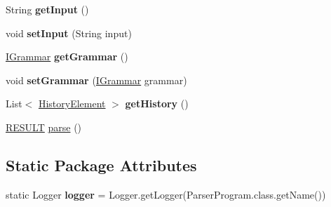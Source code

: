 \begin{DoxyCompactItemize}
\item 
\hypertarget{classparser_program_1_1_parser_program_af5f3b504a20607ba94a8e3a1cb7e39b4}{String {\bfseries get\-Input} ()}\label{classparser_program_1_1_parser_program_af5f3b504a20607ba94a8e3a1cb7e39b4}

\item 
\hypertarget{classparser_program_1_1_parser_program_a5db0b2d0b34c93fcd9cb06e0f3a75fbf}{void {\bfseries set\-Input} (String input)}\label{classparser_program_1_1_parser_program_a5db0b2d0b34c93fcd9cb06e0f3a75fbf}

\item 
\hypertarget{classparser_program_1_1_parser_program_a27f0e5e4b6be9950dc586832f7d20fc8}{\hyperlink{interfacecontext_free_1_1grammar_1_1_i_grammar}{I\-Grammar} {\bfseries get\-Grammar} ()}\label{classparser_program_1_1_parser_program_a27f0e5e4b6be9950dc586832f7d20fc8}

\item 
\hypertarget{classparser_program_1_1_parser_program_a8174d65b7fd5e3aca2dbe48ec1582700}{void {\bfseries set\-Grammar} (\hyperlink{interfacecontext_free_1_1grammar_1_1_i_grammar}{I\-Grammar} grammar)}\label{classparser_program_1_1_parser_program_a8174d65b7fd5e3aca2dbe48ec1582700}

\item 
\hypertarget{classparser_program_1_1_parser_program_ade596abd5eb6e01c6be4e9da8d71b39d}{List$<$ \hyperlink{classparser_program_1_1_history_element}{History\-Element} $>$ {\bfseries get\-History} ()}\label{classparser_program_1_1_parser_program_ade596abd5eb6e01c6be4e9da8d71b39d}

\item 
\hyperlink{enumparser_program_1_1_r_e_s_u_l_t}{R\-E\-S\-U\-L\-T} \hyperlink{classparser_program_1_1_parser_program_ac8e01a54887a9c9f0a9d277d5cbb0c61}{parse} ()
\end{DoxyCompactItemize}
\subsection*{Static Package Attributes}
\begin{DoxyCompactItemize}
\item 
\hypertarget{classparser_program_1_1_parser_program_a345c2f7b22b455b824b68058e2dc1a83}{static Logger {\bfseries logger} = Logger.\-get\-Logger(Parser\-Program.\-class.\-get\-Name())}\label{classparser_program_1_1_parser_program_a345c2f7b22b455b824b68058e2dc1a83}

\end{DoxyCompactItemize}
